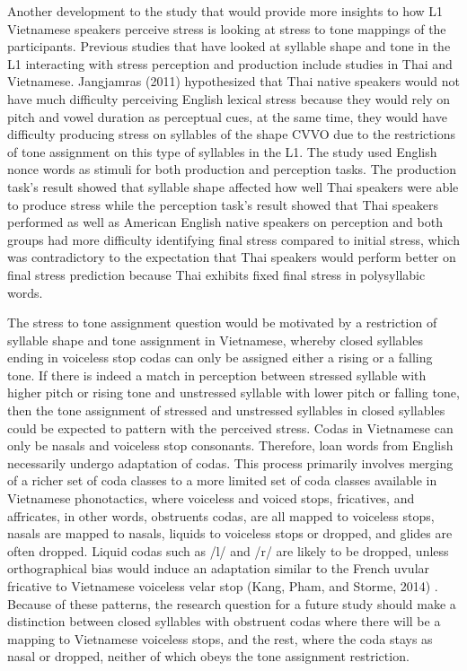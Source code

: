 \documentclass[a4paper]{article}
\begin{document}
Another development to the study that would provide more insights to how L1 Vietnamese speakers perceive stress is looking at stress to tone mappings of the participants. Previous studies that have looked at syllable shape and tone in the L1 interacting with stress perception and production include studies in Thai and Vietnamese. Jangjamras (2011) hypothesized that Thai native speakers would not have much difficulty perceiving English lexical stress because they would rely on pitch and vowel duration as perceptual cues, at the same time, they would have difficulty producing stress on syllables of the shape CVVO due to the restrictions of tone assignment on this type of syllables in the L1. The study used English nonce words as stimuli for both production and perception tasks. The production task's result showed that syllable shape affected how well Thai speakers were able to produce stress while the perception task's result showed that Thai speakers performed as well as American English native speakers on perception and both groups had more difficulty identifying final stress compared to initial stress, which was contradictory to the expectation that Thai speakers would perform better on final stress prediction because Thai exhibits fixed final stress in polysyllabic words.

The stress to tone assignment question would be motivated by a restriction of syllable shape and tone assignment in Vietnamese, whereby closed syllables ending in voiceless stop codas can only be assigned either a rising or a falling tone. If there is indeed a match in perception between stressed syllable with higher pitch or rising tone and unstressed syllable with lower pitch or falling tone, then the tone assignment of stressed and unstressed syllables in closed syllables could be expected to pattern with the perceived stress. Codas in Vietnamese can only be nasals and voiceless stop consonants. Therefore, loan words from English necessarily undergo adaptation of codas. This process primarily involves merging of a richer set of coda classes to a more limited set of coda classes available in Vietnamese phonotactics, where voiceless and voiced stops, fricatives, and affricates, in other words, obstruents codas, are all mapped to voiceless stops, nasals are mapped to nasals, liquids to voiceless stops or dropped, and glides are often dropped. Liquid codas such as /l/ and /r/ are likely to be dropped, unless orthographical bias would induce an adaptation similar to the French uvular fricative to Vietnamese voiceless velar stop (Kang, Pham, and Storme, 2014) \cite{Kang:2014aa}. Because of these patterns, the research question for a future study should make a distinction between closed syllables with obstruent codas where there will be a mapping to Vietnamese voiceless stops, and the rest, where the coda stays as nasal or dropped, neither of which obeys the tone assignment restriction.
\end{document}
